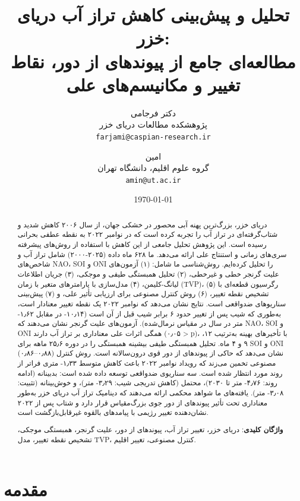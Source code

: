 \documentclass[12pt,a4paper,twocolumn]{article}
\title{\textbf{تحلیل و پیش‌بینی کاهش تراز آب دریای خزر: \\ مطالعه‌ای جامع از پیوندهای از دور، نقاط تغییر و مکانیسم‌های علی}}
\author{
    \large{دکتر فرجامی} \\
    \small{پژوهشکده مطالعات دریای خزر} \\
    \small{\texttt{farjami@caspian-research.ir}}
    \and
    \large{امین} \\
    \small{گروه علوم اقلیم، دانشگاه تهران} \\
    \small{\texttt{amin@ut.ac.ir}}
}
\date{\today}
\begin{document}
\maketitle

\begin{abstract}
\noindent دریای خزر، بزرگ‌ترین پهنه آبی محصور در خشکی جهان، از سال ۲۰۰۶ کاهش شدید و شتاب‌گرفته‌ای در تراز آب را تجربه کرده است که در نوامبر ۲۰۲۲ به نقطه عطفی بحرانی رسیده است. این پژوهش تحلیل جامعی از این کاهش با استفاده از روش‌های پیشرفته سری‌های زمانی و استنتاج علی ارائه می‌دهد. ما ۶۲۸ ماه داده (۲۰۲۵-۲۰۰۰) شامل تراز آب و شاخص‌های NAO، SOI و ONI را تحلیل کرده‌ایم. روش‌شناسی ما شامل: (۱) آزمون‌های علیت گرنجر خطی و غیرخطی، (۲) تحلیل همبستگی طیفی و موجکی، (۳) جریان اطلاعات لیانگ-کلیمن، (۴) مدل‌سازی با پارامترهای متغیر با زمان (TVP)، (۵) رگرسیون قطعه‌ای با تشخیص نقطه تغییر، (۶) روش کنترل مصنوعی برای ارزیابی تأثیر علی، و (۷) پیش‌بینی سناریوهای ضدواقعی است. نتایج نشان می‌دهد که نوامبر ۲۰۲۲ یک نقطه تغییر معنادار است، به‌طوری که شیب پس از تغییر حدود ۶ برابر شیب قبل از آن است (۱۰٫۱۴- در مقابل ۱٫۶۲- متر در سال در مقیاس نرمال‌شده). آزمون‌های علیت گرنجر نشان می‌دهند که NAO، SOI و ONI همگی اثرات علی معناداری بر تراز آب دارند (۰٫۰۵ > p)، با تأخیرهای بهینه به‌ترتیب ۱۲، ۹ و ۴ ماه. تحلیل همبستگی طیفی بیشینه همبستگی را در دوره ۲۵٫۶ ماهه برای SOI و ONI (۰٫۸۶–۰٫۸۸) نشان می‌دهد که حاکی از پیوندهای از دور قوی درون‌سالانه است. روش کنترل مصنوعی تخمین می‌زند که رویداد نوامبر ۲۰۲۲ باعث کاهش متوسط ۱٫۳۳- متری فراتر از روند مورد انتظار شده است. سه سناریوی ضدواقعی توسعه داده شده است: بدبینانه (ادامه روند: ۴٫۷۶- متر تا ۲۰۳۰)، محتمل (کاهش تدریجی شیب: ۳٫۲۹- متر)، و خوش‌بینانه (تثبیت: ۳٫۰۸- متر). یافته‌های ما شواهد محکمی ارائه می‌دهند که دینامیک تراز آب دریای خزر به‌طور معناداری تحت تأثیر پیوندهای از دور جوی بزرگ‌مقیاس قرار دارد و شتاب پس از ۲۰۲۲ نشان‌دهنده تغییر رژیمی با پیامدهای بالقوه غیرقابل‌بازگشت است.

\vspace{0.3cm}
\noindent \textbf{واژگان کلیدی}: دریای خزر، تغییر تراز آب، پیوندهای از دور، علیت گرنجر، همبستگی موجکی، تشخیص نقطه تغییر، مدل TVP، کنترل مصنوعی، تغییر اقلیم.
\end{abstract}

\section{مقدمه}
\end{document}
